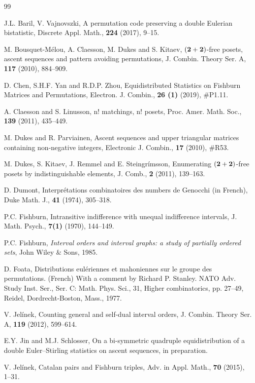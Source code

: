 \documentclass[12pt]{amsart}
\theoremstyle{plain}
\theoremstyle{definition}
\theoremstyle{example}
\theoremstyle{remark}
\numberwithin{equation}{section}
\numberwithin{figure}{section}
\begin{document}
\begin{thebibliography}{99}

J.L. Baril, V. Vajnovszki,
A permutation code preserving a double Eulerian bistatistic,
Discrete Appl. Math., {\bf224} (2017), 9--15.


M. Bousquet-M\'elou, A. Claesson, M. Dukes and S. Kitaev,
$({\bf2+2})$-free posets, ascent sequences and pattern avoiding permutations,
J. Combin. Theory Ser. A, {\bf117} (2010), 884--909.

 D. Chen, S.H.F. Yan and R.D.P. Zhou, Equidistributed Statistics on Fishburn Matrices and Permutations, Electron. J. Combin.,  {\bf26 (1)} (2019), \#P1.11.

 A. Claesson and S. Linusson, n! matchings, n! posets, Proc. Amer. Math. Soc., {\bf139} (2011), 435--449.

M. Dukes and R. Parviainen, Ascent sequences and upper triangular matrices containing non-negative integers, Electronic J. Combin., {\bf17} (2010), \#R53.

M. Dukes, S. Kitaev, J. Remmel and E. Steingr\'imsson, Enumerating $({\bf2+2})$-free posets by indistinguishable elements, J. Comb., {\bf2} (2011), 139--163.


 D. Dumont, Interpr\'etations combinatoires des numbers de Genocchi (in French), Duke Math. J., {\bf41} (1974), 305--318.



P.C. Fishburn, Intransitive indifference with unequal indifference intervals,
 J. Math. Psych.,  {\bf7(1)} (1970), 144--149.

P.C. Fishburn, {\em Interval orders and interval graphs:  a study of
partially ordered sets},
John Wiley $\&$ Sons, 1985.

D. Foata, Distributions eul\'eriennes et mahoniennes sur le groupe des permutations. (French) With a comment by Richard P. Stanley. NATO Adv. Study Inst. Ser., Ser. C: Math. Phys. Sci., 31, Higher combinatorics, pp. 27--49, Reidel, Dordrecht-Boston, Mass., 1977.

V. Jel\'inek, Counting general and self-dual interval orders, J. Combin. Theory Ser. A, {\bf119} (2012), 599--614.

 E.Y. Jin and M.J. Schlosser, On a bi-symmetric quadruple equidistribution of a double Euler--Stirling statistics on ascent sequences, in preparation.

 V. Jel\'inek, Catalan pairs and Fishburn triples, Adv. in Appl. Math., {\bf70} (2015), 1--31.


\end{thebibliography}
\end{document}
